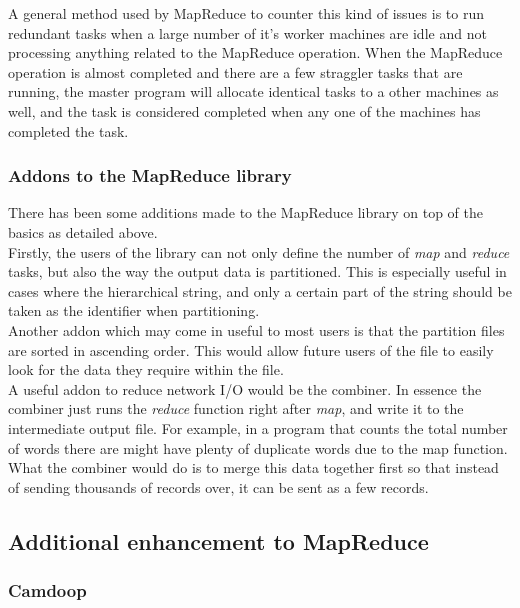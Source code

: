 \documentclass[]{article}
\begin{document}
A general method used by MapReduce to counter this kind of issues is to run redundant tasks when a large number of it's worker machines are idle and not processing anything related to the MapReduce operation. When the MapReduce operation is almost completed and there are a few straggler tasks that are running, the master program will allocate identical tasks to a other machines as well, and the task is considered completed when any one of the machines has completed the task. \\

\subsubsection{Addons to the MapReduce library}
There has been some additions made to the MapReduce library on top of the basics as detailed above.\\

Firstly, the users of the library can not only define the number of \emph{map} and \emph{reduce} tasks, but also the way the output data is partitioned. This is especially useful in cases where the hierarchical string, and only a certain part of the string should be taken as the identifier when partitioning.\\

Another addon which may come in useful to most users is that the partition files are sorted in ascending order. This would allow future users of the file to easily look for the data they require within the file. \\

A useful addon to reduce network I/O would be the combiner. In essence the combiner just runs the \emph{reduce} function right after \emph{map}, and write it to the intermediate output file. For example, in a program that counts the total number of words there are might have plenty of duplicate words due to the map function. What the combiner  would do is to merge this data together first so that instead of sending thousands of records over, it can be sent as a few records.\\

\subsection{Additional enhancement to MapReduce}
\subsubsection{Camdoop}
\end{document}
